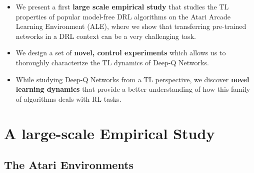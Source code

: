 \begin{itemize}
	\item We present a first \textbf{large scale empirical study} that studies the TL properties of popular model-free DRL algorithms on the Atari Arcade Learning Environment (ALE), where we show that transferring pre-trained networks in a DRL context can be a very challenging task.
	\item We design a set of \textbf{novel, control experiments} which allows us to thoroughly characterize the TL dynamics of Deep-Q Networks.
	\item While studying Deep-Q Networks from a TL perspective, we discover \textbf{novel learning dynamics} that provide a better understanding of how this family of algorithms deals with RL tasks.  
\end{itemize}


\section{A large-scale Empirical Study}
\label{sec:empirical_study}


\subsection{The Atari Environments}
\label{sec:atari_environments}

